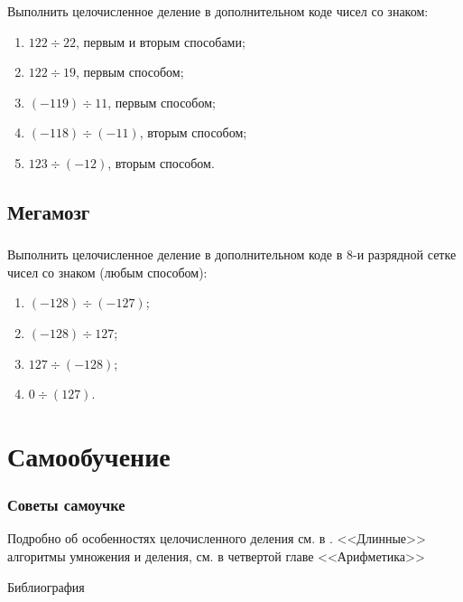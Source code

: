 \begin{frame}
    \frametitle{\TaskSimpleNumber}
    
    Выполнить целочисленное деление в дополнительном коде чисел со знаком:
    \begin{enumerate}
        \item $122\div  22$, первым и вторым способами;
        
        \item $122\div  19$, первым способом;
        
        \item $(-119) \div 11$, первым способом;
        
        \item $(-118)\div(-11)$, вторым способом;

        \item $123\div (-12)$, вторым способом.
    \end{enumerate}
\end{frame}

\subsection{Мегамозг}

\begin{frame}
    \frametitle{\TaskSimpleNumber}
    
    Выполнить целочисленное деление в дополнительном коде в 8-и разрядной сетке чисел со знаком (любым способом):
    \begin{enumerate}
        \item $(-128)\div(-127)$;
        \item $(-128)\div 127$;
        \item $127\div(-128)$;
        \item $0\div(127)$.
    \end{enumerate}
\end{frame}

\section{Самообучение}

\begin{frame}
    \frametitle{Советы самоучке}

    Подробно об особенностях целочисленного деления см. в \cite{bib:warren:algTriks}. <<Длинные>> алгоритмы умножения и деления, см. в четвертой главе <<Арифметика>> \cite{bib:knuth:artOfProgramming2}
\end{frame}

\begin{frame}[allowframebreaks]{Библиография}
    
    
\end{frame}






